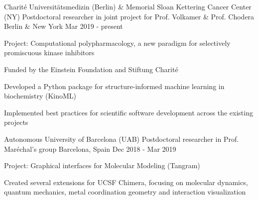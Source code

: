 


\begin{cventries}
  \cventry
    {Charité Universitätsmedizin (Berlin) \& Memorial Sloan Kettering Cancer Center (NY)} %
    {Postdoctoral researcher in joint project for Prof. Volkamer \& Prof. Chodera}  %
    {Berlin \& New York} %
    {Mar 2019 - present} %
    {
      \begin{cvitems} %
        \item {Project: Computational polypharmacology, a new paradigm for selectively promiscuous kinase inhibitors}
        \item {Funded by the Einstein Foundation and Stiftung Charité}
        \item {Developed a Python package for structure-informed machine learning in biochemistry (KinoML)}
        \item {Implemented best practices for scientific software development across the existing projects\\}
      \end{cvitems}
  }
  \cventry
    {Autonomous University of Barcelona (UAB)} %
    {Postdoctoral researcher in Prof. Maréchal's group} %
    {Barcelona, Spain} %
    {Dec 2018 - Mar 2019} %
    {
      \begin{cvitems} %
        \item {Project: Graphical interfaces for Molecular Modeling (Tangram)}
        \item {Created several extensions for UCSF Chimera, focusing on molecular dynamics,\\
              quantum mechanics, metal coordination geometry and interaction visualization\\}
      \end{cvitems}
    }


\end{cventries}

